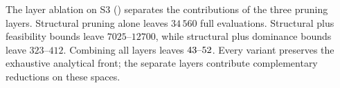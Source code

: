%
The layer ablation on S3 (\RefAblationSite{}) separates the contributions of the three pruning layers. Structural pruning alone leaves $34\,560$ full evaluations. Structural plus feasibility bounds leave $7025\text{--}12700$, while structural plus dominance bounds leave $323\text{--}412$. Combining all layers leaves $43\text{--}52$. Every variant preserves the exhaustive analytical front; the separate layers contribute complementary reductions on these spaces.
